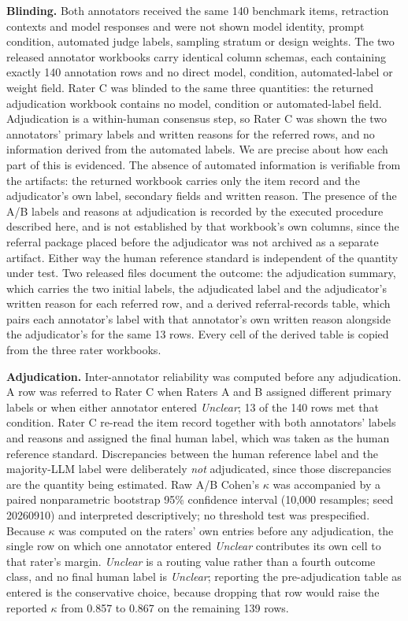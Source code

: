 \documentclass[10pt]{article}
\begin{document}
\textbf{Blinding.} Both annotators received the same 140 benchmark items, retraction
contexts and model responses and were not shown model identity, prompt condition,
automated judge labels, sampling stratum or design weights. The two released annotator
workbooks carry identical column schemas, each containing exactly 140 annotation rows
and no direct model, condition, automated-label or weight field. Rater C was blinded to
the same three quantities: the returned adjudication workbook contains no model, condition
or automated-label field. Adjudication is a within-human consensus step, so Rater C was
shown the two annotators' primary labels and written reasons for the referred rows, and no
information derived from the automated labels. We are precise about how each part of this
is evidenced. The absence of automated information is verifiable from the artifacts: the
returned workbook carries only the item record and the adjudicator's own label, secondary
fields and written reason. The presence of the A/B labels and reasons at adjudication is
recorded by the executed procedure described here, and is not established by that
workbook's own columns, since the referral package placed before the adjudicator was not
archived as a separate artifact. Either way the human reference standard is independent of
the quantity under test. Two released files document the outcome: the adjudication summary,
which carries the two initial labels, the adjudicated label and the adjudicator's written
reason for each referred row, and a derived referral-records table, which pairs each
annotator's label with that annotator's own written reason alongside the adjudicator's for
the same 13 rows. Every cell of the derived table is copied from the three rater workbooks.

\textbf{Adjudication.} Inter-annotator reliability was computed before any
adjudication. A row was referred to Rater C when Raters A and B assigned different
primary labels or when either annotator entered \emph{Unclear}; 13 of the 140 rows met
that condition. Rater C re-read the item record together with both annotators' labels
and reasons and assigned the final human label, which was taken as the human reference
standard. Discrepancies between the human
reference label and the majority-LLM label were deliberately \emph{not} adjudicated,
since those discrepancies are the quantity being estimated.
Raw A/B Cohen's $\kappa$ was accompanied by a paired nonparametric bootstrap 95\%
confidence interval (10,000 resamples; seed 20260910) and interpreted descriptively;
no threshold test was prespecified. Because $\kappa$ was computed on the raters' own
entries before any adjudication, the single row on which one annotator entered
\emph{Unclear} contributes its own cell to that rater's margin. \emph{Unclear} is a
routing value rather than a fourth outcome class, and no final human label is
\emph{Unclear}; reporting the pre-adjudication table as entered is the conservative
choice, because dropping that row would raise the reported $\kappa$ from 0.857 to
0.867 on the remaining 139 rows.
\end{document}
